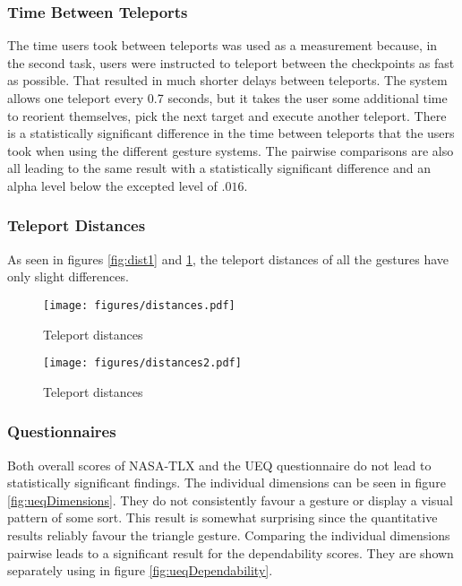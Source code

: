 \subsubsection{Time Between Teleports}
The time users took between teleports was used as a measurement because, in the second task, users were instructed to teleport between the checkpoints as fast as possible. That resulted in much shorter delays between teleports. The system allows one teleport every 0.7 seconds, but it takes the user some additional time to reorient themselves, pick the next target and execute another teleport. There is a statistically significant difference in the time between teleports that the users took when using the different gesture systems. The pairwise comparisons are also all leading to the same result with a statistically significant difference and an alpha level below the excepted level of $.016$. 

\subsubsection{Teleport Distances}
As seen in figures \ref{fig:dist1} and \ref{fig:dist2}, the teleport distances of all the gestures have only slight differences. 

\begin{figure}[!htb]
        \texttt{[image: figures/distances.pdf]}
        \caption{Teleport distances}
        \label{fig:dist1}
    \endminipage\hfill
        \texttt{[image: figures/distances2.pdf]}
        \caption{Teleport distances}
        \label{fig:dist2}
    \endminipage\hfill
\end{figure}

\subsubsection{Questionnaires}
Both overall scores of NASA-TLX and the UEQ questionnaire do not lead to statistically significant findings. The individual dimensions can be seen in figure \ref{fig:ueqDimensions}. They do not consistently favour a gesture or display a visual pattern of some sort. This result is somewhat surprising since the quantitative results reliably favour the triangle gesture. Comparing the individual dimensions pairwise leads to a significant result for the dependability scores. They are shown separately using in figure \ref{fig:ueqDependability}. 

